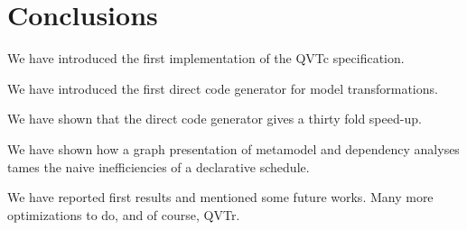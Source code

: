 \documentclass{llncs}
\begin{document}



\section{Conclusions}\label{Conclusions}

We have introduced the first implementation of the QVTc specification.

We have introduced the first direct code generator for model transformations.

We have shown that the direct code generator gives a thirty fold speed-up.

We have shown how a graph presentation of metamodel and dependency analyses tames the naive inefficiencies of a declarative schedule.

We have reported first results and mentioned some future works. Many more optimizations to do, and of course, QVTr.
\end{document}
